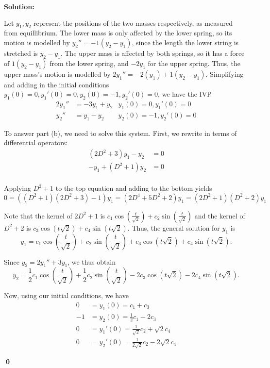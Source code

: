 \documentclass{article}
\newenvironment{solution}
{
  \ignorespaces
  \textbf{Solution:}
}
{
  \ignorespacesafterend
  \begin{flushright}
  {\bfseries \qed}
  \end{flushright}
}
\begin{document}
\begin{solution}
Let \(y_1, y_2\) represent the positions of the two masses respectively, as measured from equillibrium.  The lower mass is only affected by the lower spring, so its motion is modelled by \( y_2''=-1(y_2-y_1)\), since the length the lower string is stretched is \(y_2-y_1\).  The upper mass is affected by both springs, so it has a force of \(1(y_2-y_1) \) from the lower spring, and \(-2 y_1\) for the upper spring.  Thus, the upper mass's motion is modelled by \(2y_1''=-2(y_1) + 1(y_2-y_1)\).  Simplifying and adding in the initial conditions \(y_1(0)=0, y_1'(0)=0, y_2(0)=-1, y_2'(0)=0\), we have the IVP
\begin{align*}
2y_1''&=-3y_1+y_2 & y_1(0)=0, y_1'(0)=0 \\
y_2''&= y_1-y_2 & y_2(0)=-1, y_2'(0)=0
\end{align*}

To answer part (b), we need to solve this system.  First, we rewrite in terms of differential operators:
\begin{align*}
(2D^2+3)y_1-y_2 &= 0 \\
-y_1 + (D^2+1)y_2 &= 0\\
\end{align*}

Applying \(D^2+1\) to the top  equation and adding to the bottom yields
\[0=\left( (D^2+1)(2D^2+3) -1 \right)y_1 = (2D^4+5D^2+2)y_1 = (2D^2+1)(D^2+2)y_1\]

Note that the kernel of \(2D^2+1\) is \(c_1 \cos\left(\frac{t}{\sqrt{2}}\right)+c_2 \sin\left(\frac{t}{\sqrt{2}}\right)\) and the kernel of \(D^2+2\) is \(c_3 \cos\left(t\sqrt{2}\right)+c_4 \sin\left(t\sqrt{2}\right)\).  Thus, the general solution for \(y_1\) is 
\[y_1 = c_1 \cos\left(\frac{t}{\sqrt{2}}\right)+c_2 \sin\left(\frac{t}{\sqrt{2}}\right)+c_3 \cos\left(t\sqrt{2}\right)+c_4 \sin\left(t\sqrt{2}\right).\]

Since \(y_2=2y_1''+3y_1\), we thus obtain
\[ y_2 = \frac{1}{2}c_1 \cos\left(\frac{t}{\sqrt{2}}\right)+\frac{1}{2}c_2 \sin\left(\frac{t}{\sqrt{2}}\right)-2c_3 \cos\left(t\sqrt{2}\right)-2c_4 \sin\left(t\sqrt{2}\right).\]

Now, using our initial conditions, we have
\begin{align*}
0 &= y_1(0) = c_1+c_3 \\
-1 &= y_2 (0) = \frac{1}{2}c_1-2c_3 \\
0 &= y_1'(0) = \frac{1}{\sqrt{2}}c_2+\sqrt{2}c_4 \\
0 &= y_2'(0) = \frac{1}{2\sqrt{2}} c_2 -2\sqrt{2}c_4
\end{align*}


\end{solution}
\end{document}
